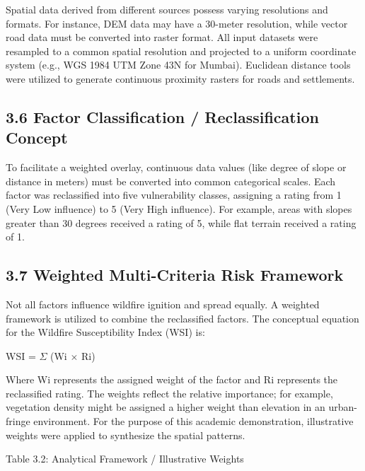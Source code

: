 \documentclass[12pt,a4paper]{article}
\begin{document}
Spatial data derived from different sources possess varying resolutions and formats. For instance, DEM data may have a 30-meter resolution, while vector road data must be converted into raster format. All input datasets were resampled to a common spatial resolution and projected to a uniform coordinate system (e.g., WGS 1984 UTM Zone 43N for Mumbai). Euclidean distance tools were utilized to generate continuous proximity rasters for roads and settlements.



\subsection*{3.6 Factor Classification / Reclassification Concept}

To facilitate a weighted overlay, continuous data values (like degree of slope or distance in meters) must be converted into common categorical scales. Each factor was reclassified into five vulnerability classes, assigning a rating from 1 (Very Low influence) to 5 (Very High influence). For example, areas with slopes greater than 30 degrees received a rating of 5, while flat terrain received a rating of 1.



\subsection*{3.7 Weighted Multi-Criteria Risk Framework}

Not all factors influence wildfire ignition and spread equally. A weighted framework is utilized to combine the reclassified factors. The conceptual equation for the Wildfire Susceptibility Index (WSI) is:


WSI = $\Sigma$ (Wi $\times$ Ri)


Where Wi represents the assigned weight of the factor and Ri represents the reclassified rating. The weights reflect the relative importance; for example, vegetation density might be assigned a higher weight than elevation in an urban-fringe environment. For the purpose of this academic demonstration, illustrative weights were applied to synthesize the spatial patterns.


Table 3.2: Analytical Framework / Illustrative Weights
\end{document}
